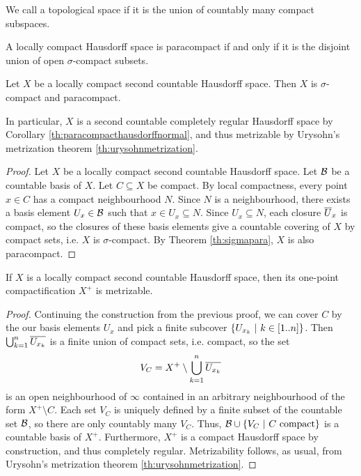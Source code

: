\begin{definition}
	We call a topological space  if it is the union of countably many compact subspaces.
\end{definition}
\begin{theorem}{\label{th:sigmapara}}
	A locally compact Hausdorff space is paracompact if and only if it is the disjoint union of open $\sigma$-compact subsets.
\end{theorem}
\begin{theorem}
	Let $X$ be a locally compact second countable Hausdorff space. Then $X$ is $\sigma$-compact and paracompact.
\end{theorem}
In particular, $X$ is a second countable completely regular Hausdorff space by Corollary \ref{th:paracompacthausdorffnormal}, and thus metrizable by Urysohn's metrization theorem \ref{th:urysohnmetrization}.
\begin{proof}
	Let $X$ be a locally compact second countable Hausdorff space.
	Let $\mathcal{B}$ be a countable basis of $X$. Let $C \subseteq X$ be compact. By local compactness, every point $x \in C$ has a compact neighbourhood $N$. Since $N$ is a neighbourhood, there exists a basis element $U_x \in \mathcal{B}$ such that $x \in U_x \subseteq N$. Since $U_x \subseteq N$, each closure $\overline{{U}}_x$ is compact, so the closures of these basis elements give a countable covering of $X$ by compact sets, i.e. $X$ is $\sigma$-compact. By Theorem \ref{th:sigmapara}, $X$ is also paracompact.
\end{proof}
\begin{theorem}
	If $X$ is a locally compact second countable Hausdorff space, then its one-point compactification $X^+$ is metrizable.
\end{theorem}
\begin{proof}
	Continuing the construction from the previous proof, we can cover $C$ by the our basis elements $U_x$ and pick a finite subcover $\qty{U_{x_k} ~\middle|~k \in [1..n]}$.
	\newpar
	Then $\bigcup_{k = 1}^n \overline{{U_{x_k}}}$ is a finite union of compact sets, i.e. compact, so the set 
	\begin{align*}
		V_C = X^+ \setminus \bigcup_{k = 1}^n \overline{{U_{x_k}}}
	\end{align*} 
	is an open neighbourhood of $\infty$ contained in an arbitrary neighbourhood of the form $X^+ \setminus C$.
	\newpar
	Each set $V_C$ is uniquely defined by a finite subset of the countable set $\mathcal{B}$, so there are only countably many $V_C$. Thus, $\mathcal{B} \cup \qty{V_C ~\middle|~C \text{ compact}}$ is a countable basis of $X^+$. Furthermore, $X^+$ is a compact Hausdorff space by construction, and thus completely regular. Metrizability follows, as usual, from Urysohn's metrization theorem \ref{th:urysohnmetrization}.
\end{proof}
\clearpage
